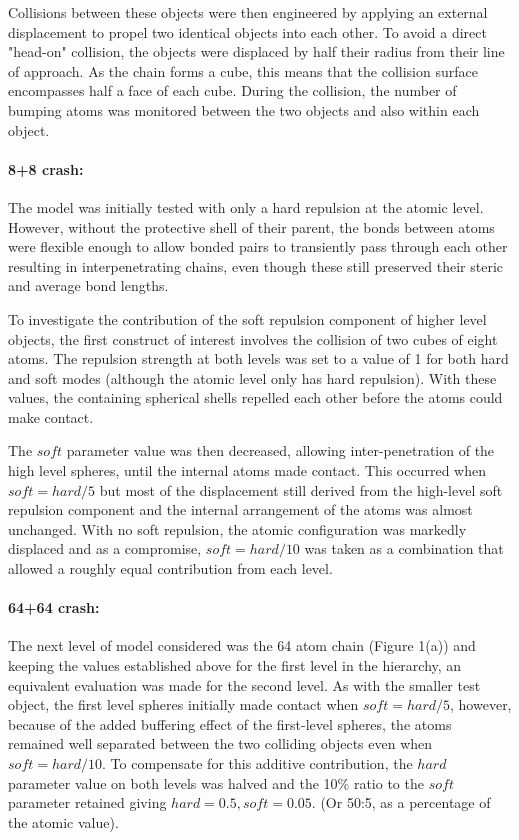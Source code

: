 \documentclass[review]{elsarticle}
\begin{document}
{{{{{Collisions between these objects were then engineered by applying an external
displacement to propel two identical objects into each other.   To avoid a direct "head-on"
collision, the objects were displaced by half their radius from their line of approach.
As the chain forms a cube, this means that the collision surface encompasses half a face of each cube.
During the collision, the number of bumping atoms was monitored between the two objects
and also within each object.

\paragraph{8+8 crash:\\}

The model was initially tested with only a hard repulsion at the atomic level.
However, without the protective shell of their parent, the bonds between atoms were flexible enough 
to allow bonded pairs to transiently pass through each other resulting 
in interpenetrating chains, even though these still preserved their steric and average bond lengths.

To investigate the contribution of the soft repulsion component of higher level objects,
the first construct of interest involves the collision of two cubes of eight atoms.  The
repulsion strength at both levels was set to a value of 1 for both hard and soft modes
(although the atomic level only has hard repulsion).   With these values, the containing
spherical shells repelled each other before the atoms could make contact.

The $soft$ parameter value was then decreased, allowing inter-penetration of the high
level spheres,  until the internal atoms made contact.   This occurred when $soft = hard/5$
but most of the displacement still derived from the high-level soft repulsion component
and the internal arrangement of the atoms was almost unchanged.   With no soft repulsion,
the atomic configuration was markedly displaced and as a compromise, $soft = hard/10$
was taken as a combination that allowed a roughly equal contribution from each level.

\paragraph{64+64 crash:\\}

The next level of model considered was the 64 atom chain (Figure 1(a)) and keeping the values established
above for the first level in the hierarchy, an equivalent evaluation was made for the second level.
As with the smaller test object, the first level spheres initially made contact when $soft = hard/5$,
however, because of the added buffering effect of the first-level spheres, the atoms remained
well separated between the two colliding objects even when $soft = hard/10$.  To compensate for
this additive contribution, the $hard$ parameter value on both levels was halved and the 10\%
ratio to the $soft$ parameter retained giving $hard = 0.5, soft = 0.05$.  
(Or 50:5, as a percentage of the atomic value). 

}}}}}
\end{document}
